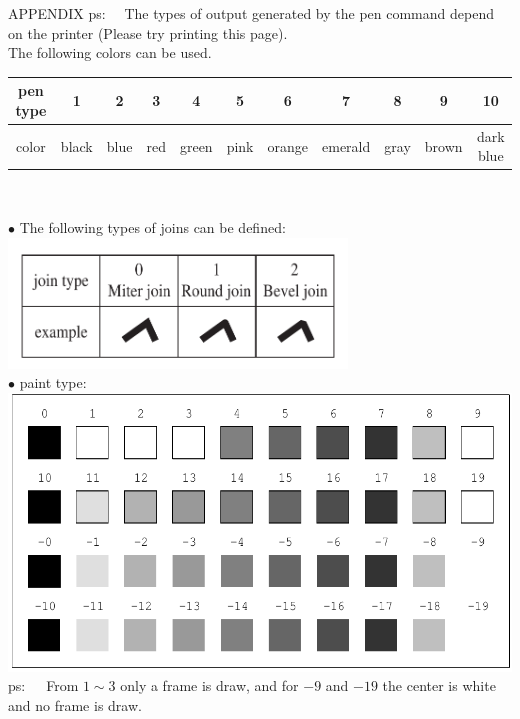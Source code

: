 \begin{qsection}{APPENDIX}
ps:~~ The types of output generated by the pen command
depend on the printer (Please try printing this page).
\\
\hypertarget{pen-color}{}
The following colors can be used.\\

\begin{center}
\begin{tabular}{|c|c|c|c|c|c|c|c|c|c|c|}
 \hline
 pen type& 1& 2& 3& 4& 5& 6& 7& 8& 9&10  \\ \hline
 color   & black& blue& red& green& pink& orange& emerald& gray&brown & 
 dark blue \\ \hline
\end{tabular}\\
\end{center}

\vspace{5mm}
\hypertarget{join-type}{}
{\large \hspace{-1.5ex}$\bullet$ 
The following types of joins can be defined:}\\
\includegraphics[width=9cm]{fig/join-type.pdf}\\

\vspace{5mm}
{\large \hspace{-1.5ex}$\bullet$ paint type:}\\
\includegraphics{fig/paint.pdf}\\
ps:~~~From $1 \sim 3$ only a frame is draw,
and for $-9$ and $-19$ the center is white and no frame is draw.

\end{qsection}
